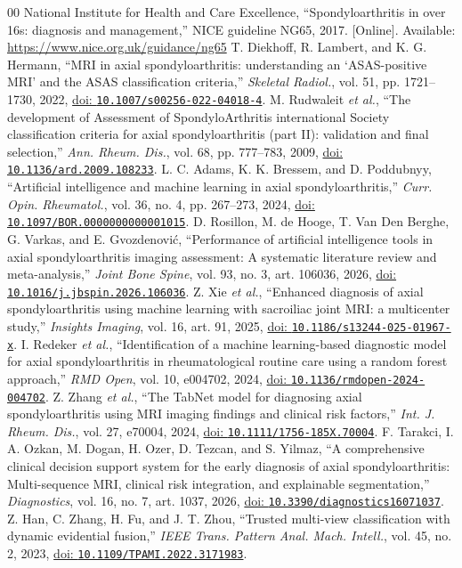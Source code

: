 \documentclass[conference]{IEEEtran}
\newcommand{\doi}[1]{\href{https://doi.org/#1}{doi: \nolinkurl{#1}}}
\begin{document}
\begin{thebibliography}{00}
 National Institute for Health and Care Excellence, ``Spondyloarthritis in over 16s: diagnosis and management,'' NICE guideline NG65, 2017. [Online]. Available: \url{https://www.nice.org.uk/guidance/ng65}
 T. Diekhoff, R. Lambert, and K. G. Hermann, ``MRI in axial spondyloarthritis: understanding an `ASAS-positive MRI' and the ASAS classification criteria,'' \emph{Skeletal Radiol.}, vol. 51, pp. 1721--1730, 2022, \doi{10.1007/s00256-022-04018-4}.
 M. Rudwaleit \emph{et al.}, ``The development of Assessment of SpondyloArthritis international Society classification criteria for axial spondyloarthritis (part II): validation and final selection,'' \emph{Ann. Rheum. Dis.}, vol. 68, pp. 777--783, 2009, \doi{10.1136/ard.2009.108233}.
 L. C. Adams, K. K. Bressem, and D. Poddubnyy, ``Artificial intelligence and machine learning in axial spondyloarthritis,'' \emph{Curr. Opin. Rheumatol.}, vol. 36, no. 4, pp. 267--273, 2024, \doi{10.1097/BOR.0000000000001015}.
 D. Rosillon, M. de Hooge, T. Van Den Berghe, G. Varkas, and E. Gvozdenovi\'{c}, ``Performance of artificial intelligence tools in axial spondyloarthritis imaging assessment: A systematic literature review and meta-analysis,'' \emph{Joint Bone Spine}, vol. 93, no. 3, art. 106036, 2026, \doi{10.1016/j.jbspin.2026.106036}.
 Z. Xie \emph{et al.}, ``Enhanced diagnosis of axial spondyloarthritis using machine learning with sacroiliac joint MRI: a multicenter study,'' \emph{Insights Imaging}, vol. 16, art. 91, 2025, \doi{10.1186/s13244-025-01967-x}.
 I. Redeker \emph{et al.}, ``Identification of a machine learning-based diagnostic model for axial spondyloarthritis in rheumatological routine care using a random forest approach,'' \emph{RMD Open}, vol. 10, e004702, 2024, \doi{10.1136/rmdopen-2024-004702}.
 Z. Zhang \emph{et al.}, ``The TabNet model for diagnosing axial spondyloarthritis using MRI imaging findings and clinical risk factors,'' \emph{Int. J. Rheum. Dis.}, vol. 27, e70004, 2024, \doi{10.1111/1756-185X.70004}.
 F. Tarakci, I. A. Ozkan, M. Dogan, H. Ozer, D. Tezcan, and S. Yilmaz, ``A comprehensive clinical decision support system for the early diagnosis of axial spondyloarthritis: Multi-sequence MRI, clinical risk integration, and explainable segmentation,'' \emph{Diagnostics}, vol. 16, no. 7, art. 1037, 2026, \doi{10.3390/diagnostics16071037}.
 Z. Han, C. Zhang, H. Fu, and J. T. Zhou, ``Trusted multi-view classification with dynamic evidential fusion,'' \emph{IEEE Trans. Pattern Anal. Mach. Intell.}, vol. 45, no. 2, 2023, \doi{10.1109/TPAMI.2022.3171983}.

\end{thebibliography}
\end{document}
